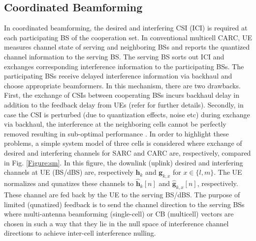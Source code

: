 \documentclass[article,10pt,twocolumn]{IEEEtran}
\begin{document}
\subsection{Coordinated Beamforming}\label{sec:cb}
In coordinated beamforming, the desired and interfering CSI (ICI) is required at each participating BS of the cooperation set. In conventional multicell CARC, UE measures channel state of serving and neighboring BSs and reports the quantized channel information to the serving BS. The serving BS sorts out ICI and exchanges corresponding interference information to the participating BSs. The participating BSs receive delayed interference information via backhaul and choose appropriate beamformers. In this mechanism, there are two drawbacks. First, the exchange of CSIs between cooperating BSs incurs backhaul delay in addition to the feedback delay from UEs (refer \citep{6666229,4150700} for further details). Secondly, in case the CSI is perturbed (due to quantization effects, noise etc) during exchange via backhaul, the interference at the neighboring cells cannot be perfectly removed resulting in sub-optimal performance \citep{5962731}. In order to highlight these problems, a simple system model of three cells is considered where exchange of desired and interfering channels for SARC and CARC are, respectively, compared in Fig. \ref{Figure:sm}. 
In this figure, the downlink (uplink) desired and interfering channels at UE (BS/dBS) are, respectively $\textbf{h}_{k}$ and $\textbf{g}_{k,x}$ for $x \in \{l,m\}$. The UE normalizes and qunatizes these channels to $\hat{\textbf{h}}_{k}[n]$ and $\hat{\textbf{g}}_{k,x}[n]$, respectively. These channel are fed back by the UE to the serving BS/dBS. The purpose of limited (qunatized) feedback is to send the channel direction to the serving BSs \citep{4150700} where multi-antenna beamforming (single-cell) or CB (multicell) vectors are chosen in such a way that they lie in the null space of interference channel directions \citep{5755206} to achieve inter-cell interference nulling.
\end{document}
